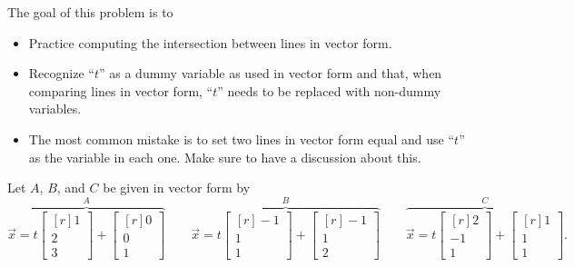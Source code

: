 \documentclass{problemset}
\newcommand{\mat}[1]{\begin{bmatrix*}[r]#1\end{bmatrix*}}
\begin{document}
	\question
	\begin{annotation}
		\begin{goals}
			
			The goal of this problem is to
			\begin{itemize}
				\item Practice computing the intersection between lines
					in vector form.
				\item Recognize ``$t$'' as a dummy variable as used
					in vector form and that, when comparing lines in
					vector form, ``$t$'' needs to be replaced with
					non-dummy variables.
			\end{itemize}
		\end{goals}

		\begin{notes}
			\begin{itemize}
				\item The most common mistake is to set two lines
					in vector form equal and use ``$t$'' as
					the variable in each one. Make sure to have a discussion
					about this.
			\end{itemize}
		\end{notes}
	\end{annotation}
	Let $A$, $B$, and $C$ be given in vector form by 
	\[
	\overbrace{\vec x=t\mat{1\\2\\3}+\mat{0\\0\\1}}^{\displaystyle A}
	\qquad \overbrace{\vec x=t\mat{-1\\1\\1}+\mat{-1\\1\\2}}^{\displaystyle B}
	\qquad \overbrace{\vec x=t\mat{2\\-1\\1}+\mat{1\\1\\1}}^{\displaystyle C}.
	\]
\end{document}
